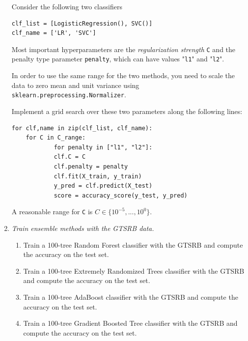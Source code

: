 \documentclass[a4paper,12pt]{scrartcl}
\newcommand{\python}{{\fbox{\texttt{\bfseries python}}\quad}}
\begin{document}
\begin{enumerate}
Consider the following two classifiers
	\begin{verbatim}
clf_list = [LogisticRegression(), SVC()]
clf_name = ['LR', 'SVC']
	\end{verbatim}
	Most important hyperparameters are the \emph{regularization strength} \verb+C+ and
	the penalty type parameter \verb+penalty+, which can have values "\verb+l1+" and "\verb+l2+".
	
	In order to use the same range for the two methods, you need to scale the data to
	zero mean and unit variance using \verb+sklearn.preprocessing.Normalizer+.
	
	Implement
	a grid search over these two parameters along the following lines:
	\begin{verbatim}
for clf,name in zip(clf_list, clf_name):
    for C in C_range:
		    for penalty in ["l1", "l2"]:
            clf.C = C
            clf.penalty = penalty
            clf.fit(X_train, y_train)
            y_pred = clf.predict(X_test)
            score = accuracy_score(y_test, y_pred)
\end{verbatim}
A reasonable range for \verb+C+ is $C\in\{10^{-5},...,10^{0}\}$.

\item \python \emph{Train ensemble methods with the GTSRB data.}

\begin{enumerate}
\item Train a 100-tree Random Forest classifier with the GTSRB and compute the accuracy on the test set.
\item Train a 100-tree Extremely Randomized Trees classifier with the GTSRB and compute the accuracy on the test set.
\item Train a 100-tree AdaBoost classifier with the GTSRB and compute the accuracy on the test set.
\item Train a 100-tree Gradient Boosted Tree classifier with the GTSRB and compute the accuracy on the test set.
\end{enumerate}


\end{enumerate}
\end{document}
